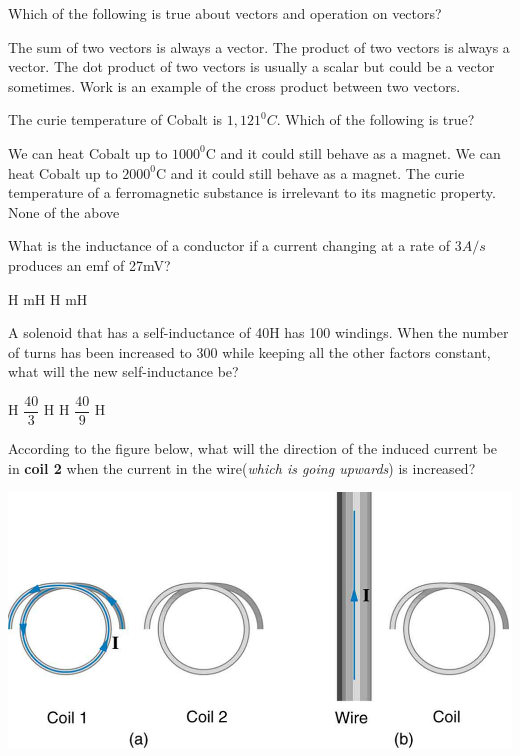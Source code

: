 \documentclass[12pt,addpoints]{exam}
\begin{document}
{{{\begin{questions}
					\question Which of the following is true about vectors and operation on vectors? 
					\begin{choices}
						\choice The sum of two vectors is always a vector.
						\choice The product of two vectors is always a vector.
						\choice The dot product of two vectors is usually a scalar but could be a vector sometimes.
						\choice Work is an example of the cross product between two vectors.
					\end{choices}
					\question The curie temperature of Cobalt is $1,121^{0}C$. Which of the following is true?
					\begin{choices}
						\choice We can heat Cobalt up to $1000^0$C and it could still behave as a magnet.
						\choice We can heat Cobalt up to $2000^0$C and it could still behave as a magnet.
						\choice The curie temperature of a ferromagnetic substance is irrelevant to its magnetic property. 
						\choice None of the above
					\end{choices}
					\question What is the inductance of a conductor if a current changing at a rate of $3A/s$ produces an emf of 27mV?\\
					\begin{oneparchoices}
						 H
						 mH
						 H
						 mH
					\end{oneparchoices}
					\question A solenoid that has a self-inductance of 40H has 100 windings. When the number of turns has been increased to 300 while keeping all the other factors constant, what will the new self-inductance be? \\
					\begin{oneparchoices}
						\choice 120 H
						\choice $\dfrac{40}{3}$ H
						\choice 360 H
						\choice $\dfrac{40}{9}$ H
					\end{oneparchoices}
					\question According to the figure below, what will the direction of the induced current be in \textbf{coil 2} when the current in the wire(\textit{which is going upwards}) is increased?
					\begin{center}
						\includegraphics[scale=0.5]{coils}

\end{center}
\end{questions}}}}
\end{document}
